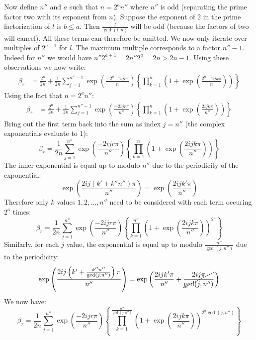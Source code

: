\begin{solution}
\begin{enumerate}[label=(\alph*)]
        Now define $n''$ and $a$ such that $n=2^an''$ where $n''$ is odd (separating the prime factor two with its exponent from $n$). Suppose the exponent of 2 in the prime factorization of $l$ is $b \leq a$. Then $\frac{l}{\gcd(l,n)}$ will be odd (because the factors of two will cancel). All these terms can therefore be omitted. We now only iterate over multiples of $2^{a+1}$ for $l$. The maximum multiple corresponds to a factor $n''-1$. Indeed for $n''$ we would have $n'' 2^{a+1} = 2n''2^a = 2n > 2n-1$. Using these observations we now write:
        \begin{align*}
            \beta_r &= \frac{2^n}{2n} + \frac{1}{2n}\sum_{j=1}^{n''-1} \exp\left(\frac{-2^{a+1}ijr\pi}{n}\right) \left\{\prod_{k=1}^n \left(1 + \exp\left(\frac{2^{a+1}ijk\pi}{n}\right)\right)\right\}
        \end{align*}
        Using the fact that $n=2^an''$:
        \begin{align*}
            \beta_r &= \frac{2^n}{2n} + \frac{1}{2n}\sum_{j=1}^{n''-1} \exp\left(\frac{-2ijr\pi}{n''}\right)  \left\{\prod_{k=1}^n \left(1 + \exp\left(\frac{2ijk\pi}{n''}\right)\right)\right\}
        \end{align*}
        Bring out the first term back into the sum as index $j = n''$ (the complex exponentials evaluate to $1$):
        \[
            \beta_r = \frac{1}{2n}\sum_{j=1}^{n''}\exp\left(\frac{-2ijr\pi}{n''}\right)  \left\{\prod_{k=1}^n \left(1 + \exp\left(\frac{2ijk\pi}{n''}\right)\right)\right\}
        \]
        The inner exponential is equal up to modulo $n''$ due to the periodicity of the exponential:
        \[
            \exp\left(\frac{2ij(k' + k''n'')\pi}{n''}\right) = \exp\left(\frac{2ijk'\pi}{n''}\right)
        \] Therefore only $k$ values $1,2,\ldots,n''$ need to be considered with each term occuring $2^a$ times:
        \[
            \beta_r = \frac{1}{2n}\sum_{j=1}^{n''} \exp\left(\frac{-2ijr\pi}{n''}\right) \left\{\prod_{k=1}^{n''} \left(1 + \exp\left(\frac{2ijk\pi}{n''}\right)\right)^{2^a}\right\}
        \]
        Similarly, for each $j$ value, the exponential is equal up to modulo $\frac{n''}{\gcd(j,n'')}$ due to the periodicity: 
        \begin{align*}
            \exp\left(\frac{2ij\left(k' + \frac{k''n''}{\gcd(j,n'')}
                \right)\pi}{n''}\right) = \exp\left(\frac{2ijk'\pi}{n''} + \cancel{\frac{2ij\pi}{\gcd(j,n'')}}\right)
        \end{align*}
        We now have:
        \[
            \beta_r = \frac{1}{2n}\sum_{j=1}^{n''} \exp\left(\frac{-2ijr\pi}{n''}\right)  \left\{\prod_{k=1}^{\frac{n''}{\gcd(j,n'')}} \left(1 + \exp\left(\frac{2ijk\pi}{n''}\right)\right)^{2^a\gcd(j,n'')}\right\}
\]
\end{enumerate}
\end{solution}
